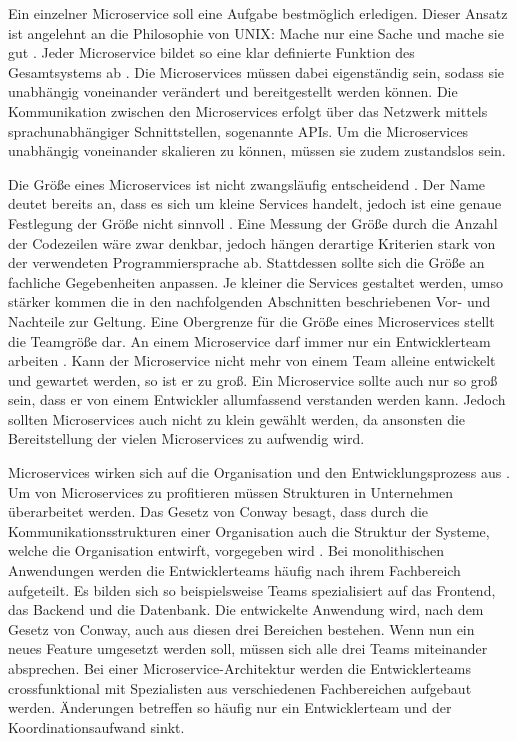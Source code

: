 Ein einzelner Microservice soll eine Aufgabe bestmöglich erledigen. Dieser Ansatz ist angelehnt an die Philosophie von \ac{UNIX}: \glqq Mache nur eine Sache und mache sie gut\grqq{} \parencite[vgl.][]{salusQuarter1994}. Jeder Microservice bildet so eine klar definierte Funktion des Gesamtsystems ab \parencite[vgl.][S. 64]{trempArchitekturen2021}. Die Microservices müssen dabei eigenständig sein, sodass sie unabhängig voneinander verändert und bereitgestellt werden können. Die Kommunikation zwischen den Microservices erfolgt über das Netzwerk mittels sprachunabhängiger Schnittstellen, sogenannte \acp{API}. Um die Microservices unabhängig voneinander skalieren zu können, müssen sie zudem zustandslos sein.

Die Größe eines Microservices ist nicht zwangsläufig entscheidend \parencite[vgl.][S. 2]{wolffMicroservices2018}. Der Name deutet bereits an, dass es sich um kleine Services handelt, jedoch ist eine genaue Festlegung der Größe nicht sinnvoll \parencite[vgl.][S. 22]{newmanMicroservices2015}. Eine Messung der Größe durch die Anzahl der Codezeilen wäre zwar denkbar, jedoch hängen derartige Kriterien stark von der verwendeten Programmiersprache ab. Stattdessen sollte sich die Größe an fachliche Gegebenheiten anpassen. Je kleiner die Services gestaltet werden, umso stärker kommen die in den nachfolgenden Abschnitten beschriebenen Vor- und Nachteile zur Geltung. Eine Obergrenze für die Größe eines Microservices stellt die Teamgröße dar. An einem Microservice darf immer nur ein Entwicklerteam arbeiten \parencite[vgl.][S. 23]{newmanMicroservices2015}. Kann der Microservice nicht mehr von einem Team alleine entwickelt und gewartet werden, so ist er zu groß. Ein Microservice sollte auch nur so groß sein, dass er von einem Entwickler allumfassend verstanden werden kann. Jedoch sollten Microservices auch nicht zu klein gewählt werden, da ansonsten die Bereitstellung der vielen Microservices zu aufwendig wird.

Microservices wirken sich auf die Organisation und den Entwicklungsprozess aus \parencite[vgl.][S. 2]{wolffMicroservices2018}. Um von Microservices zu profitieren müssen Strukturen in Unternehmen überarbeitet werden. Das Gesetz von Conway besagt, dass durch die Kommunikationsstrukturen einer Organisation auch die Struktur der Systeme, welche die Organisation entwirft, vorgegeben wird \parencite[vgl.]{conwayHow1968}. Bei monolithischen Anwendungen werden die Entwicklerteams häufig nach ihrem Fachbereich aufgeteilt. Es bilden sich so beispielsweise Teams spezialisiert auf das Frontend, das Backend und die Datenbank. Die entwickelte Anwendung wird, nach dem Gesetz von Conway, auch aus diesen drei Bereichen bestehen. Wenn nun ein neues Feature umgesetzt werden soll, müssen sich alle drei Teams miteinander absprechen. Bei einer Microservice-Architektur werden die Entwicklerteams crossfunktional mit Spezialisten aus verschiedenen Fachbereichen aufgebaut werden. Änderungen betreffen so häufig nur ein Entwicklerteam und der Koordinationsaufwand sinkt.

